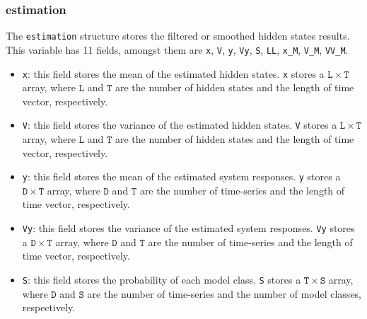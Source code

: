{\subsubsection{estimation} 
The \lstinline[basicstyle = \mlttfamily \small ]!estimation! structure stores the filtered or smoothed hidden states results.
This variable has 11 fields, amongst them  are \lstinline[basicstyle = \mlttfamily \small ]!x!, \lstinline[basicstyle = \mlttfamily \small ]!V!, \lstinline[basicstyle = \mlttfamily \small ]!y!, \lstinline[basicstyle = \mlttfamily \small ]!Vy!,  \lstinline[basicstyle = \mlttfamily \small ]!S!, \lstinline[basicstyle = \mlttfamily \small ]!LL!, \lstinline[basicstyle = \mlttfamily \small ]!x_M!, \lstinline[basicstyle = \mlttfamily \small ]!V_M!, \lstinline[basicstyle = \mlttfamily \small ]!VV_M!.

\begin{itemize}
\item \lstinline[basicstyle = \mlttfamily \small ]!x!: this field stores the mean of the estimated hidden states. \lstinline[basicstyle = \mlttfamily \small ]!x! stores a $\mathtt{L} \times \mathtt{T}$ array, where $\mathtt{L}$ and $\mathtt{T}$ are the number of hidden states and the length of time vector, respectively. 
\item \lstinline[basicstyle = \mlttfamily \small ]!V!: this field stores the variance of the estimated hidden states. \lstinline[basicstyle = \mlttfamily \small ]!V! stores a $\mathtt{L} \times \mathtt{T}$ array, where $\mathtt{L}$ and $\mathtt{T}$ are the number of hidden states and the length of time vector, respectively. 
\item \lstinline[basicstyle = \mlttfamily \small ]!y!: this field stores the mean of the estimated system responses. \lstinline[basicstyle = \mlttfamily \small ]!y! stores a $\mathtt{D} \times \mathtt{T}$ array, where $\mathtt{D}$ and $\mathtt{T}$ are the number of time-series and the length of time vector, respectively. 
\item \lstinline[basicstyle = \mlttfamily \small ]!Vy!: this field stores the variance of the estimated system responses. \lstinline[basicstyle = \mlttfamily \small ]!Vy! stores a $\mathtt{D} \times \mathtt{T}$ array, where $\mathtt{D}$ and $\mathtt{T}$ are the number of time-series and the length of time vector, respectively. 
\item \lstinline[basicstyle = \mlttfamily \small ]!S!: this field stores the probability of each model class. \lstinline[basicstyle = \mlttfamily \small ]!S! stores a $\mathtt{T} \times \mathtt{S}$ array, where $\mathtt{D}$ and $\mathtt{S}$ are the number of time-series and the number of model classes, respectively. 

\end{itemize}}
